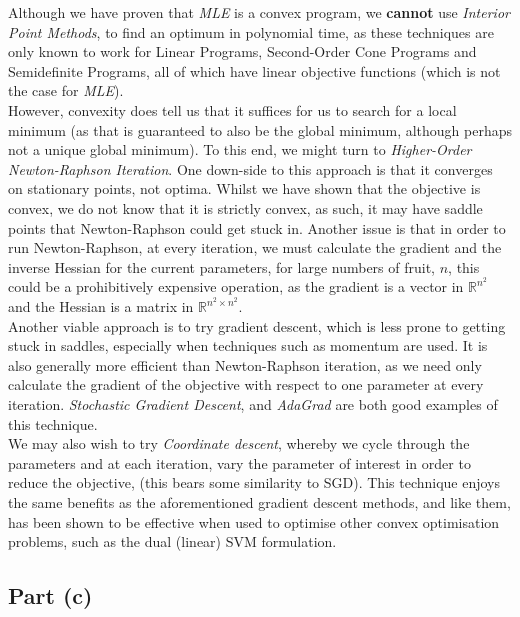 Although we have proven that \textit{MLE} is a convex program, we \textbf{cannot} use \textit{Interior Point Methods}, to find an optimum in polynomial time, as these techniques are only known to work for Linear Programs, Second-Order Cone Programs and Semidefinite Programs\cite{nesterov1994interior}, all of which have linear objective functions (which is not the case for \textit{MLE}).\\[1em]

However, convexity does tell us that it suffices for us to search for a local minimum (as that is guaranteed to also be the global minimum, although perhaps not a unique global minimum). To this end, we might turn to \textit{Higher-Order Newton-Raphson Iteration}. One down-side to this approach is that it converges on stationary points, not optima. Whilst we have shown that the objective is convex, we do not know that it is strictly convex, as such, it may have saddle points that Newton-Raphson could get stuck in. Another issue is that in order to run Newton-Raphson, at every iteration, we must calculate the gradient and the inverse Hessian for the current parameters, for large numbers of fruit, $n$, this could be a prohibitively expensive operation, as the gradient is a vector in $\mathbb{R}^{n^2}$ and the Hessian is a matrix in $\mathbb{R}^{n^2\times n^2}$.\\[1em]

Another viable approach is to try gradient descent, which is less prone to getting stuck in saddles, especially when techniques such as momentum are used. It is also generally more efficient than Newton-Raphson iteration, as we need only calculate the gradient of the objective with respect to one parameter at every iteration. \textit{Stochastic Gradient Descent}, and \textit{AdaGrad} are both good examples of this technique.\\[1em]

We may also wish to try \textit{Coordinate descent}, whereby we cycle through the parameters and at each iteration, vary the parameter of interest in order to reduce the objective, (this bears some similarity to SGD). This technique enjoys the same benefits as the aforementioned gradient descent methods, and like them, has been shown to be effective when used to optimise other convex optimisation problems, such as the dual (linear) SVM formulation\cite{hsieh2008dual}.

\subsection{Part (c)}

